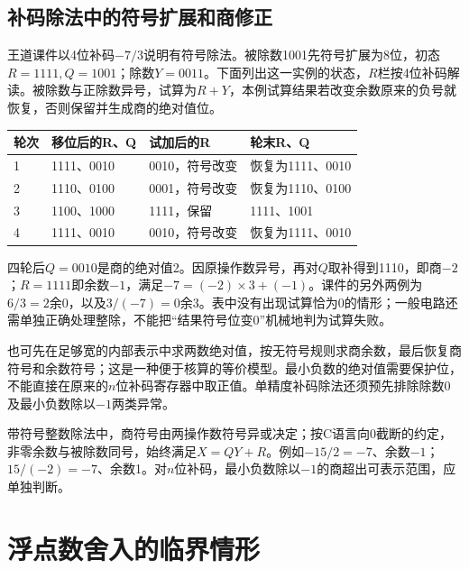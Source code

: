 \subsection{补码除法中的符号扩展和商修正}\label{CO02-signed-division-trace}

王道课件以4位补码\(-7/3\)说明有符号除法。被除数1001先符号扩展为8位，初态\(R=1111,Q=1001\)；除数\(Y=0011\)。下面列出这一实例的状态，\(R\)栏按4位补码解读。被除数与正除数异号，试算为\(R+Y\)，本例试算结果若改变余数原来的负号就恢复，否则保留并生成商的绝对值位。

\begin{wideblock}\par\medskip\noindent\begin{minipage}{\linewidth}\fontsize{9.3}{12}\selectfont\begin{tabularx}{\linewidth}{@{}YYYY@{}}
\toprule\noalign{}
轮次 & 移位后的R、Q & 试加后的R & 轮末R、Q \\
\midrule\noalign{}


1 & 1111、0010 & 0010，符号改变 & 恢复为1111、0010 \\
2 & 1110、0100 & 0001，符号改变 & 恢复为1110、0100 \\
3 & 1100、1000 & 1111，保留 & 1111、1001 \\
4 & 1111、0010 & 0010，符号改变 & 恢复为1111、0010 \\
\bottomrule\end{tabularx}
\end{minipage}\par\medskip\end{wideblock}

四轮后\(Q=0010\)是商的绝对值2。因原操作数异号，再对\(Q\)取补得到1110，即商\(-2\)；\(R=1111\)即余数\(-1\)，满足\(-7=(-2)\times3+(-1)\)。课件的另外两例为\(6/3=2\)余0，以及\(3/(-7)=0\)余3。表中没有出现试算恰为0的情形；一般电路还需单独正确处理整除，不能把``结果符号位变0''机械地判为试算失败。

也可先在足够宽的内部表示中求两数绝对值，按无符号规则求商余数，最后恢复商符号和余数符号；这是一种便于核算的等价模型。最小负数的绝对值需要保护位，不能直接在原来的\(n\)位补码寄存器中取正值。单精度补码除法还须预先排除除数0及最小负数除以\(-1\)两类异常。

带符号整数除法中，商符号由两操作数符号异或决定；按C语言向0截断的约定，非零余数与被除数同号，始终满足\(X=QY+R\)。例如\(-15/2=-7\)、余数\(-1\)；\(15/(-2)=-7\)、余数1。对\(n\)位补码，最小负数除以\(-1\)的商超出可表示范围，应单独判断。

\section{浮点数舍入的临界情形}\label{CO02-rounding-complete}

